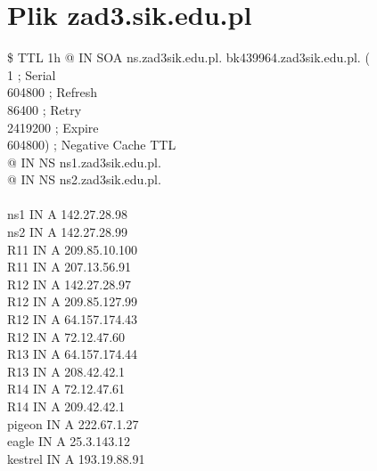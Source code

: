 \documentclass{article}
\begin{document}
\newpage
\section*{Plik zad3.sik.edu.pl}
\$ TTL 1h
@ IN SOA ns.zad3sik.edu.pl. bk439964.zad3sik.edu.pl. ( \\
\hspace*{3cm}1 ; Serial \\
\hspace*{3cm}604800 ; Refresh \\
\hspace*{3cm}86400 ; Retry \\
\hspace*{3cm}2419200 ; Expire\\
\hspace*{3cm}604800) ; Negative Cache TTL\\

@ \hspace{4cm} IN NS ns1.zad3sik.edu.pl. \\
@ \hspace{4cm} IN NS ns2.zad3sik.edu.pl. \\
\\
ns1 \hspace{3.8cm} IN A 142.27.28.98\\
ns2 \hspace{3.8cm} IN A 142.27.28.99 \\
R11 \hspace{3.7cm} IN A 209.85.10.100 \\
R11 \hspace{3.7cm} IN A 207.13.56.91 \\
R12 \hspace{3.7cm} IN A 142.27.28.97 \\
R12 \hspace{3.7cm} IN A 209.85.127.99 \\
R12 \hspace{3.7cm} IN A 64.157.174.43 \\
R12 \hspace{3.7cm} IN A 72.12.47.60 \\
R13 \hspace{3.7cm} IN A 64.157.174.44 \\
R13 \hspace{3.7cm} IN A 208.42.42.1 \\
R14 \hspace{3.7cm} IN A 72.12.47.61 \\
R14 \hspace{3.7cm} IN A 209.42.42.1 \\
pigeon \hspace{3.3cm} IN A 222.67.1.27 \\
eagle \hspace{3.55cm} IN A 25.3.143.12 \\
kestrel \hspace{3.3cm} IN A 193.19.88.91 \\
\end{document}
